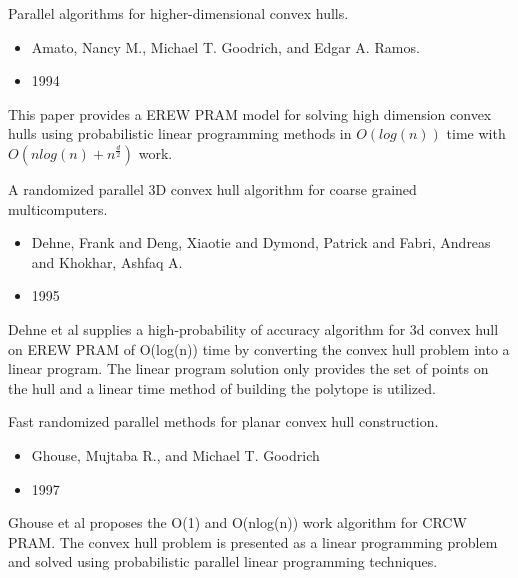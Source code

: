 \documentclass[11pt]{beamer}
\begin{document}
\begin{frame}{Parallel algorithms for higher-dimensional convex hulls.}
\begin{itemize}
\item{Amato, Nancy M., Michael T. Goodrich, and Edgar A. Ramos.}
\item{1994}
\end{itemize}
This paper provides a EREW PRAM model for solving high dimension convex hulls using probabilistic linear programming methods in $O(log(n))$ time with $O(nlog(n)+n^{\frac{d}{2}})$ work.
\end{frame}

\begin{frame}{A randomized parallel 3D convex hull algorithm for coarse grained multicomputers.}
\begin{itemize}
\item{Dehne, Frank and Deng, Xiaotie and Dymond, Patrick and Fabri, Andreas and Khokhar, Ashfaq A.}
\item{1995}
\end{itemize}
Dehne et al supplies a high-probability of accuracy algorithm for 3d convex hull on EREW PRAM of O(log(n)) time by converting the convex hull problem into a linear program. The linear program solution only provides the set of points on the hull and a linear time method of building the polytope is utilized.

\end{frame}


\begin{frame}{Fast randomized parallel methods for planar convex hull construction.}
\begin{itemize}
\item{Ghouse, Mujtaba R., and Michael T. Goodrich}
\item{1997}
\end{itemize}
Ghouse et al proposes the O(1) and O(nlog(n)) work algorithm for CRCW PRAM. The convex hull problem is presented as a linear programming problem and solved using probabilistic parallel linear programming techniques.

\end{frame}
\end{document}
